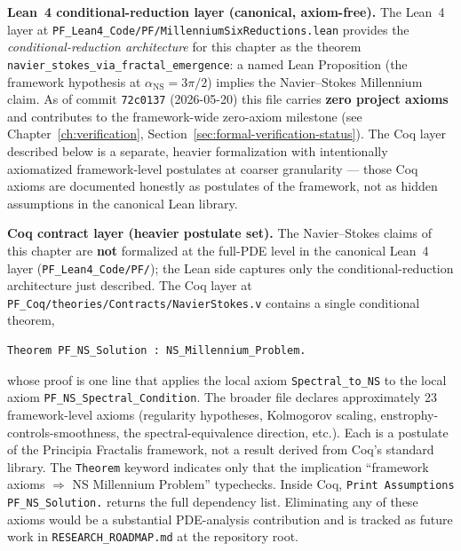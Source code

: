 \begin{remark}
\textbf{Lean~4 conditional-reduction layer (canonical, axiom-free).} The Lean~4 layer at \texttt{PF\_Lean4\_Code/PF/MillenniumSixReductions.lean} provides the \emph{conditional-reduction architecture} for this chapter as the theorem \texttt{navier\_stokes\_via\_fractal\_emergence}: a named Lean Proposition (the framework hypothesis at $\alpha_{\mathrm{NS}} = 3\pi/2$) implies the Navier--Stokes Millennium claim. As of commit \texttt{72c0137} (2026-05-20) this file carries \textbf{zero project axioms} and contributes to the framework-wide zero-axiom milestone (see Chapter~\ref{ch:verification}, Section~\ref{sec:formal-verification-status}). The Coq layer described below is a separate, heavier formalization with intentionally axiomatized framework-level postulates at coarser granularity --- those Coq axioms are documented honestly as postulates of the framework, not as hidden assumptions in the canonical Lean library.

\medskip
\textbf{Coq contract layer (heavier postulate set).}
The Navier--Stokes claims of this chapter are \textbf{not} formalized at the full-PDE level in the canonical Lean~4 layer (\texttt{PF\_Lean4\_Code/PF/}); the Lean side captures only the conditional-reduction architecture just described. The Coq layer at \texttt{PF\_Coq/theories/Contracts/NavierStokes.v} contains a single conditional theorem,
\begin{verbatim}
Theorem PF_NS_Solution : NS_Millennium_Problem.
\end{verbatim}
whose proof is one line that applies the local axiom \texttt{Spectral\_to\_NS} to the local axiom \texttt{PF\_NS\_Spectral\_Condition}. The broader file declares approximately 23 framework-level axioms (regularity hypotheses, Kolmogorov scaling, enstrophy-controls-smoothness, the spectral-equivalence direction, etc.). Each is a postulate of the Principia Fractalis framework, not a result derived from Coq's standard library. The \texttt{Theorem} keyword indicates only that the implication ``framework axioms $\Rightarrow$ NS Millennium Problem'' typechecks. Inside Coq, \texttt{Print Assumptions PF\_NS\_Solution.} returns the full dependency list. Eliminating any of these axioms would be a substantial PDE-analysis contribution and is tracked as future work in \texttt{RESEARCH\_ROADMAP.md} at the repository root.
\end{remark}

